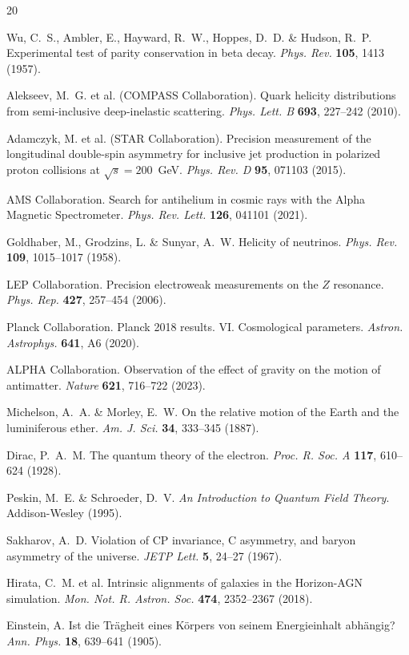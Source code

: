 \documentclass[11pt,a4paper]{article}
\begin{document}
\begin{thebibliography}{20}

Wu, C.~S., Ambler, E., Hayward, R.~W., Hoppes, D.~D. \& Hudson, R.~P.
Experimental test of parity conservation in beta decay.
\textit{Phys. Rev.} \textbf{105}, 1413 (1957).

Alekseev, M.~G. et al. (COMPASS Collaboration).
Quark helicity distributions from semi-inclusive deep-inelastic scattering.
\textit{Phys. Lett. B} \textbf{693}, 227--242 (2010).

Adamczyk, M. et al. (STAR Collaboration).
Precision measurement of the longitudinal double-spin asymmetry for inclusive jet production in polarized proton collisions at $\sqrt{s}=200$~GeV.
\textit{Phys. Rev. D} \textbf{95}, 071103 (2015).

AMS Collaboration.
Search for antihelium in cosmic rays with the Alpha Magnetic Spectrometer.
\textit{Phys. Rev. Lett.} \textbf{126}, 041101 (2021).

Goldhaber, M., Grodzins, L. \& Sunyar, A.~W.
Helicity of neutrinos.
\textit{Phys. Rev.} \textbf{109}, 1015--1017 (1958).

LEP Collaboration.
Precision electroweak measurements on the $Z$ resonance.
\textit{Phys. Rep.} \textbf{427}, 257--454 (2006).

Planck Collaboration.
Planck 2018 results. VI. Cosmological parameters.
\textit{Astron. Astrophys.} \textbf{641}, A6 (2020).

ALPHA Collaboration.
Observation of the effect of gravity on the motion of antimatter.
\textit{Nature} \textbf{621}, 716--722 (2023).

Michelson, A.~A. \& Morley, E.~W.
On the relative motion of the Earth and the luminiferous ether.
\textit{Am. J. Sci.} \textbf{34}, 333--345 (1887).

Dirac, P.~A.~M.
The quantum theory of the electron.
\textit{Proc. R. Soc. A} \textbf{117}, 610--624 (1928).

Peskin, M.~E. \& Schroeder, D.~V.
\textit{An Introduction to Quantum Field Theory}.
Addison-Wesley (1995).

Sakharov, A.~D.
Violation of CP invariance, C asymmetry, and baryon asymmetry of the universe.
\textit{JETP Lett.} \textbf{5}, 24--27 (1967).

Hirata, C.~M. et al.
Intrinsic alignments of galaxies in the Horizon-AGN simulation.
\textit{Mon. Not. R. Astron. Soc.} \textbf{474}, 2352--2367 (2018).

Einstein, A.
Ist die Tr\"agheit eines K\"orpers von seinem Energieinhalt abh\"angig?
\textit{Ann. Phys.} \textbf{18}, 639--641 (1905).

\end{thebibliography}
\end{document}
